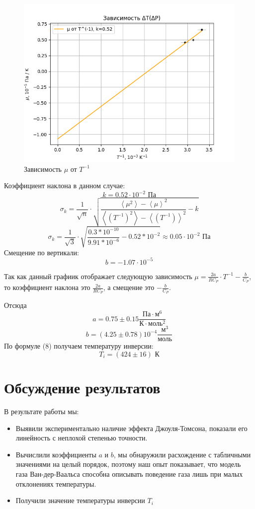 \documentclass[a4paper, 10pt, twocolumn]{article}
\begin{document}
    \begin{figure}[H]
        \centering
        \includegraphics[width=1\linewidth]{graphs/figure2.png}
        \begin{center}
            \caption{Зависимость $\mu$ от $T^{-1}$ }
        \end{center}
    \end{figure}
    Коэффициент наклона в данном случае: $$ k = 0.52 \cdot 10^{-2} \text{ Па}$$
    $$\sigma_k = \frac{1}{\sqrt{n}} \cdot \sqrt{\frac{\left\langle \mu^2 \right\rangle - \left\langle \mu \right\rangle^2}
    {\left\langle \left({T^{-1}}\right)^2 \right\rangle - \left\langle \left({T^{-1}}\right) \right\rangle^2} - k }$$
    $$\sigma_k = \frac{1}{\sqrt{3}}\cdot \sqrt{\frac{0.3*10^{-10}}{9.91*10^{-6}} - 0.52*10^{-2}} \approx 0.05 \cdot 10^{-2} \text{ Па}$$
    Смещение по вертикали: $$ b = -1.07 \cdot 10^{-5}$$

    Так как данный графиик отображает следующую зависимость $ \mu = \frac{2a}{RC_P} \cdot T ^{-1} - \frac{b}{C_P}$, то коэффициент наклона это $\frac{2a}{RC_P}$, а смещение это $-\frac{b}{C_P}$.

    Отсюда $$ a = 0.75 \pm 0.15 \frac{\text{Па} \cdot \text{м}^6}{\text{К} \cdot \text{моль}^2} $$
    $$b = (4.25 \pm 0.78) 10^{-4} \frac{\text{м}^3}{\text{моль}}$$
    По формуле (8) получаем температуру инверсии: $$ T_i = (424 \pm 16)\text{ К}$$

\section{Обсуждение результатов}
    В результате работы мы:
    \begin{itemize}
        \item Выявили экспериментально наличие эффекта Джоуля-Томсона,
        показали его линейность с неплохой степенью точности.

        \item Вычислили коэффициенты $a$ и $b$, мы обнаружили расхождение с табличными значениями на целый порядок, поэтому наш опыт показывает, что модель газа Ван-дер-Ваальса способна описывать поведение газа лишь при малых отклонениях температуры.

        \item Получили значение температуры инверсии $T_i$
    \end{itemize}
    \newpage
\onecolumn
\end{document}
